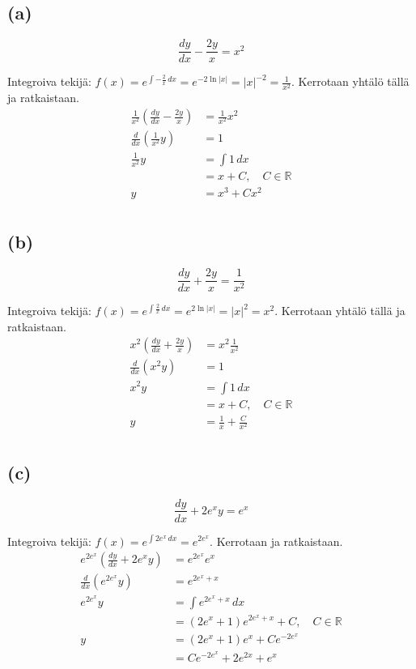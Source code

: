 \documentclass{article}
\begin{document}
\subsection*{(a)}

\[
  \frac{dy}{dx} - \frac{2y}{x} = x^2
\]

Integroiva tekijä: $f(x) = e^{\int -\frac{2}{x} \,dx} = e^{-2 \ln |x|}
= |x|^{-2} = \frac{1}{x^2}$.
Kerrotaan yhtälö tällä ja ratkaistaan.
\begin{align*}
  \frac{1}{x^2} (\frac{dy}{dx} - \frac{2y}{x}) &= \frac{1}{x^2}x^2 \\
  \frac{d}{dx}(\frac{1}{x^2}y) &= 1 \\
  \frac{1}{x^2}y &= \int 1 \,dx \\
                 &= x + C, \quad C \in \mathbb{R} \\
  y &= x^3 + Cx^2 \\
\end{align*}

\subsection*{(b)}

\[
  \frac{dy}{dx} + \frac{2y}{x} = \frac{1}{x^2}
\]

Integroiva tekijä: $f(x) = e^{\int \frac{2}{x}\,dx} = e^{2 \ln |x|}
= |x|^2 = x^2$.
Kerrotaan yhtälö tällä ja ratkaistaan.
\begin{align*}
  x^2(\frac{dy}{dx} + \frac{2y}{x}) &= x^2\frac{1}{x^2} \\
  \frac{d}{dx}(x^2y) &= 1 \\
  x^2y &= \int 1\,dx \\
       &= x + C, \quad C \in \mathbb{R} \\
  y &= \frac{1}{x} + \frac{C}{x^2} \\
\end{align*}

\subsection*{(c)}

\[
  \frac{dy}{dx} + 2e^xy = e^x
\]

Integroiva tekijä: $f(x) = e^{\int 2e^x\,dx} = e^{2e^x}$.
Kerrotaan ja ratkaistaan.
\begin{align*}
  e^{2e^x}(\frac{dy}{dx} + 2e^xy) &= e^{2e^x}e^x \\
  \frac{d}{dx}(e^{2e^x}y) &= e^{2e^x + x} \\
  e^{2e^x}y &= \int e^{2e^x + x}\,dx \\
            &= (2e^x + 1)e^{2e^x + x} + C, \quad C \in \mathbb{R} \\
  y &= (2e^x + 1)e^x + Ce^{-2e^x} \\
    &= Ce^{-2e^x} + 2e^{2x} + e^x \\
\end{align*}
\end{document}
